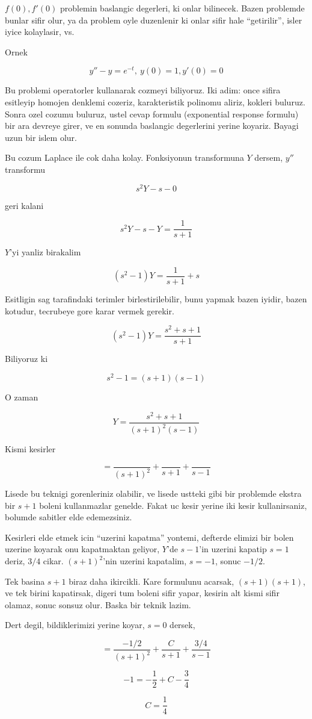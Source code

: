 \documentclass[12pt,fleqn]{article}
\begin{document}
$f(0),f'(0)$ problemin baslangic degerleri, ki onlar bilinecek. Bazen
problemde bunlar sifir olur, ya da problem oyle duzenlenir ki onlar sifir
hale ``getirilir'', isler iyice kolaylasir, vs.

Ornek

\[ y'' - y = e^{-t}, \ y(0) = 1, y'(0)=0 \]

Bu problemi operatorler kullanarak cozmeyi biliyoruz. Iki adim: once sifira
esitleyip homojen denklemi cozeriz, karakteristik polinomu aliriz, kokleri
buluruz. Sonra ozel cozumu buluruz, ustel cevap formulu (exponential
response formulu) bir ara devreye girer, ve en sonunda baslangic
degerlerini yerine koyariz. Bayagi uzun bir islem olur. 

Bu cozum Laplace ile cok daha kolay. Fonksiyonun transformuna $Y$ dersem,
$y''$ transformu

\[ s^2Y - s - 0\]

geri kalani

\[ s^2Y - s - Y = \frac{1}{s+1}\]

$Y$'yi yanliz birakalim

\[ (s^2-1)Y = \frac{1}{s+1} + s \]

Esitligin sag tarafindaki terimler birlestirilebilir, bunu yapmak bazen
iyidir, bazen kotudur, tecrubeye gore karar vermek gerekir. 

\[ (s^2-1)Y = \frac{s^2+s+1}{s+1} \]

Biliyoruz ki

\[ s^2-1 = (s+1)(s-1) \]

O zaman 

\[ Y = \frac{s^2+s+1}{(s+1)^2(s-1)} \]


Kismi kesirler 

\[ = \frac{}{(s+1)^2} + \frac{}{s+1} + \frac{}{s-1} \]


Lisede bu teknigi gorenleriniz olabilir, ve lisede ustteki gibi bir
problemde ekstra bir $s+1$ boleni kullanmazlar genelde. Fakat uc kesir
yerine iki kesir kullanirsaniz, bolumde sabitler elde edemezsiniz. 

Kesirleri elde etmek icin ``uzerini kapatma'' yontemi, defterde elimizi bir
bolen uzerine koyarak onu kapatmaktan geliyor, $Y$'de  $s-1$'in
uzerini kapatip $s=1$ deriz, $3/4$ cikar. $(s+1)^2$'nin uzerini kapatalim,
$s=-1$, sonuc $-1/2$. 

Tek basina $s+1$ biraz daha ikircikli. Kare formulunu acarsak,
$(s+1)(s+1)$, ve tek birini kapatirsak, digeri tum boleni sifir yapar,
kesirin alt kismi sifir olamaz, sonuc sonsuz olur. Baska bir teknik lazim. 

Dert degil, bildiklerimizi yerine koyar, $s=0$ dersek, 

\[ = \frac{-1/2}{(s+1)^2} + \frac{C}{s+1} + \frac{3/4}{s-1} \]

\[ -1 = -\frac{1}{2} + C - \frac{3}{4}\]

\[ C = \frac{1}{4} \]
\end{document}

